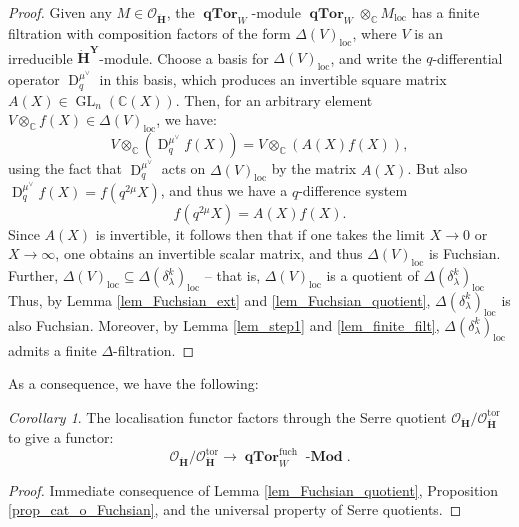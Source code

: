 \documentclass[a4paper]{report}
\theoremstyle{theorem}
\theoremstyle{definition}
\theoremstyle{remark}
\theoremstyle{proposition}
\theoremstyle{conjecture}
\theoremstyle{lemma}
\theoremstyle{corollary}
\newtheorem{corollary}{Corollary}
\theoremstyle{exercise}
\theoremstyle{example}
\newcommand{\C}{\mathbb{C}}
\newcommand{\mcal}{\mathcal}
\newcommand{\on}{\operatorname}
\newcommand{\lmod}{\on{\mathbf{-Mod}}}
\newcommand{\qTor}{\on{\mathbf{qTor}}}
\begin{document}
  \begin{proof}
      Given any $M \in \mcal{O}_{\mathbf{\ddot{\mathbf{H}}}}$, the 
      $\qTor_W$-module $\qTor_W\otimes_\C M_{\on{loc}}$ has a finite filtration with composition factors 
      of the form $\Delta(V)_{\on{loc}}$, where $V$ is an irreducible $\mathbf{\dot{H}}^{\mathbf{Y}}$-module. 
      Choose a basis for $\Delta(V)_{\on{loc}}$, and write 
      the $q$-differential operator $\on{D}^{\mu^\vee}_q$
      in this basis, which produces an invertible square matrix $A(X) \in \on{GL}_n(\C(X))$.
      Then, for an arbitrary element $V \otimes_\C f(X) \in \Delta(V)_{\on{loc}}$, we have:
      $$V \otimes_\C \left(\on{D}_q^{\mu^\vee} f(X)\right) = V \otimes_\C \left(A(X) f(X)\right),$$
      using the fact that $\on{D}_q^{\mu^\vee}$ acts on $\Delta(V)_{\on{loc}}$ by the matrix $A(X)$. But also $\on{D}_q^{\mu^\vee}f(X) = f(q^{2\mu}X)$,
      and thus we have a $q$-difference system 
      $$f(q^{2\mu}X) = A(X) f(X).$$
      Since $A(X)$ is invertible, it follows then that if one takes the limit $X \to 0$ or $X \to \infty$,
      one obtains an invertible scalar matrix, and thus $\Delta(V)_{\on{loc}}$ is Fuchsian.
      Further, $\Delta(V)_{\on{loc}} \subseteq \Delta(\delta_\lambda^k)_{\on{loc}}$ -- 
      that is, $\Delta(V)_{\on{loc}}$ is a quotient of $\Delta(\delta_\lambda^k)_{\on{loc}}$
      Thus, by Lemma \ref{lem_Fuchsian_ext} and \ref{lem_Fuchsian_quotient},
      $\Delta(\delta_\lambda^k)_{\on{loc}}$ is also Fuchsian. Moreover, by 
      Lemma \ref{lem_step1} and \ref{lem_finite_filt},
      $\Delta(\delta_\lambda^k)_{\on{loc}}$ admits a finite $\Delta$-filtration.
  \end{proof}
  
  As a consequence, we have the following:
  
  \begin{corollary}\label{cor_quotient_tor}
      The localisation functor factors through the Serre quotient 
      $\mcal{O}_{\mathbf{\ddot{\mathbf{H}}}} / \mcal{O}_{\ddot{\mathbf{H}}}^{\on{tor}}$ 
      to give a functor:
      $$\mcal{O}_{\mathbf{\ddot{\mathbf{H}}}} / \mcal{O}_{\ddot{\mathbf{H}}}^{\on{tor}} \longrightarrow \qTor_W^{\on{fuch}}\lmod.$$
  \end{corollary}
  
  \begin{proof}
      Immediate consequence of Lemma \ref{lem_Fuchsian_quotient},
      Proposition \ref{prop_cat_o_Fuchsian}, and the universal property of 
      Serre quotients.
  \end{proof}
  
\end{document}
